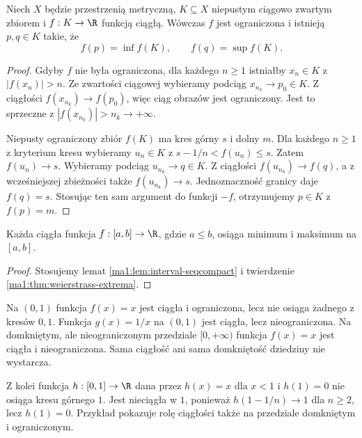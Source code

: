 \begin{twierdzenie}
\label{ma1:thm:weierstrass-extrema}
Niech $X$ będzie przestrzenią metryczną, $K\subseteq X$ niepustym ciągowo zwartym zbiorem i $f:K\to\R$ funkcją ciągłą. Wówczas $f$ jest ograniczona i istnieją $p,q\in K$ takie, że
\[
 f(p)=\inf f(K),\qquad f(q)=\sup f(K).
\]
\end{twierdzenie}
\begin{proof}
Gdyby $f$ nie była ograniczona, dla każdego $n\ge1$ istniałby $x_n\in K$ z $|f(x_n)|>n$. Ze zwartości ciągowej wybieramy podciąg $x_{n_k}\to p_0\in K$. Z ciągłości $f(x_{n_k})\to f(p_0)$, więc ciąg obrazów jest ograniczony. Jest to sprzeczne z $|f(x_{n_k})|>n_k\to+\infty$.

Niepusty ograniczony zbiór $f(K)$ ma kres górny $s$ i dolny $m$. Dla każdego $n\ge1$ z kryterium kresu wybieramy $u_n\in K$ z $s-1/n<f(u_n)\le s$. Zatem $f(u_n)\to s$. Wybieramy podciąg $u_{n_k}\to q\in K$. Z ciągłości $f(u_{n_k})\to f(q)$, a z wcześniejszej zbieżności także $f(u_{n_k})\to s$. Jednoznaczność granicy daje $f(q)=s$. Stosując ten sam argument do funkcji $-f$, otrzymujemy $p\in K$ z $f(p)=m$.
\end{proof}
\begin{wniosek}
\label{ma1:cor:interval-extrema}
Każda ciągła funkcja $f:[a,b]\to\R$, gdzie $a\le b$, osiąga minimum i maksimum na $[a,b]$.
\end{wniosek}
\begin{proof}
Stosujemy lemat \ref{ma1:lem:interval-seqcompact} i twierdzenie \ref{ma1:thm:weierstrass-extrema}.
\end{proof}
\begin{przyklad}
\label{ma1:ex:extrema-assumptions}
Na $(0,1)$ funkcja $f(x)=x$ jest ciągła i ograniczona, lecz nie osiąga żadnego z kresów $0,1$. Funkcja $g(x)=1/x$ na $(0,1)$ jest ciągła, lecz nieograniczona. Na domkniętym, ale nieograniczonym przedziale $[0,+\infty)$ funkcja $f(x)=x$ jest ciągła i nieograniczona. Sama ciągłość ani sama domkniętość dziedziny nie wystarcza.

Z kolei funkcja $h:[0,1]\to\R$ dana przez $h(x)=x$ dla $x<1$ i $h(1)=0$ nie osiąga kresu górnego $1$. Jest nieciągła w $1$, ponieważ $h(1-1/n)\to1$ dla $n\ge2$, lecz $h(1)=0$. Przykład pokazuje rolę ciągłości także na przedziale domkniętym i ograniczonym.
\end{przyklad}


